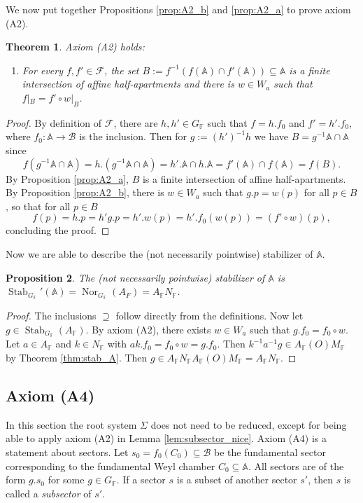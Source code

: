 \documentclass[12pt]{amsart}
\newcommand{\F}{\mathbb{F} }
\newcommand{\A}{\mathbb{A}}
\newcommand{\Fun}{\mathscr{F}} %
\newcommand{\B}{\mathcal{B}}
\numberwithin{equation}{section}
\newtheorem{theorem}{Theorem}[section]
\newtheorem{proposition}[theorem]{Proposition}
\theoremstyle{remark} %
\begin{document}
		We now put together Propositions \ref{prop:A2_b} and \ref{prop:A2_a} to prove axiom (A2).
		\begin{theorem}\label{thm:A2}
			Axiom (A2) holds: 
			\begin{enumerate}
				\item [(A2)] For every $f,f' \in \Fun$, the set $B := f^{-1}(f(\A) \cap f'(\A)) \subseteq \A$ is a finite intersection of affine half-apartments and there is $w\in W_a$ such that $f|_B = f'\circ w |_{B}$. 
			\end{enumerate}
		\end{theorem}
		\begin{proof}
			By definition of $\Fun$, there are $h,h' \in G_\F$ such that $f=h.f_0$ and $f' = h'.f_0$, where $f_0 \colon \A \to \B$ is the inclusion. Then for $g:= (h')^{-1}h$ we have $B = g^{-1}\A \cap \A$ since
			$$
			f(g^{-1}\A \cap \A) = h.(g^{-1}\A \cap \A) = h'.\A \cap h.\A = f'(\A) \cap f(\A) = f(B).
			$$ 
			By Proposition \ref{prop:A2_a}, $B$ is a finite intersection of affine half-apartments. By Proposition \ref{prop:A2_b}, there is $w\in W_a$ such that $g.p = w(p)$ for all $p\in B$, so that for all $p \in B$
			$$
			f(p) = h.p = h'g.p = h'.w(p) = h'.f_0(w(p)) = (f' \circ w)(p),
			$$
			concluding the proof.
		\end{proof}
		
		Now we are able to describe the (not necessarily pointwise) stabilizer of $\A$.
		
		\begin{proposition}\label{thm:stab'_A}
			The (not necessarily pointwise) stabilizer of $\A$ is $\operatorname{Stab}_{G_\F}'(\A) = \operatorname{Nor}_{G_\F}(A_F) = A_\F N_\F$. 
		\end{proposition} 
	\begin{proof}
		The inclusions $\supseteq$ follow directly from the definitions. Now let $g\in \operatorname{Stab}_{G_\F}(A_\F)$. By axiom (A2), %
		there exists $w\in W_a$ such that $g.f_0 = f_0 \circ w$. Let $a\in A_\F$ and $k\in N_\F$ with $ak.f_0 = f_0 \circ w = g.f_0$. Then $k^{-1}a^{-1}g \in A_\F(O)M_\F$ by Theorem \ref{thm:stab_A}. Then $g\in A_\F N_\F A_\F(O) M_\F = A_\F N_\F$. 
	\end{proof}
		
		
\subsection{Axiom (A4)}\label{sec:A4}
		
		In this section the root system $\Sigma$ does not need to be reduced, except for being able to apply axiom (A2) in Lemma \ref{lem:subsector_nice}. Axiom (A4) is a statement about sectors. Let $s_0 = f_0(C_0) \subseteq \B$ be the fundamental sector corresponding to the fundamental Weyl chamber $C_0 \subseteq \A$. All sectors are of the form $g.s_0$ for some $g\in G_\F$. If a sector $s$ is a subset of another sector $s'$, then $s$ is called a \emph{subsector} of $s'$. 
		
\end{document}
